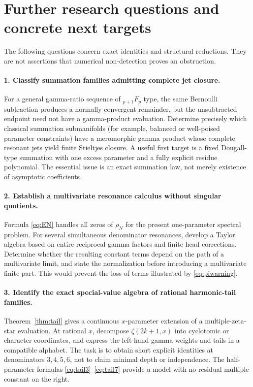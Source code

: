 \section{Further research questions and concrete next targets}\label{sec:research}

The following questions concern exact identities and structural reductions.
They are not assertions that numerical non-detection proves an obstruction.

\paragraph{1. Classify summation families admitting complete jet closure.}
For a general gamma-ratio sequence of ${}_{p+1}F_p$ type, the same
Bernoulli subtraction produces a normally convergent remainder, but the
unsubtracted endpoint need not have a gamma-product evaluation.
Determine precisely which classical summation submanifolds (for example,
balanced or well-poised parameter constraints) have a meromorphic gamma
product whose complete resonant jets yield finite Stieltjes closure.
A useful first target is a fixed Dougall-type summation with one excess
parameter and a fully explicit residue polynomial.  The essential issue is
an exact summation law, not merely existence of asymptotic coefficients.

\paragraph{2. Establish a multivariate resonance calculus without singular quotients.}
Formula \eqref{eq:EN} handles all zeros of $\rho_N$ for the present
one-parameter spectral problem.  For several simultaneous denominator
resonances, develop a Taylor algebra based on entire reciprocal-gamma
factors and finite head corrections.  Determine whether the resulting
constant terms depend on the path of a multivariate limit, and state the
normalization before introducing a multivariate finite part.  This would
prevent the loss of terms illustrated by \eqref{eq:piwarning}.

\paragraph{3. Identify the exact special-value algebra of rational harmonic-tail families.}
Theorem~\ref{thm:tail} gives a continuous $x$-parameter extension of a
multiple-zeta-star evaluation.  At rational $x$, decompose
$\zeta(2k+1,x)$ into cyclotomic or character coordinates, and express the
left-hand gamma weights and tails in a compatible alphabet.
The task is to obtain short explicit identities at denominators
$3,4,5,6$, not to claim minimal depth or independence.
The half-parameter formulas \eqref{eq:tail3}--\eqref{eq:tail7}
provide a model with no residual multiple constant on the right.

